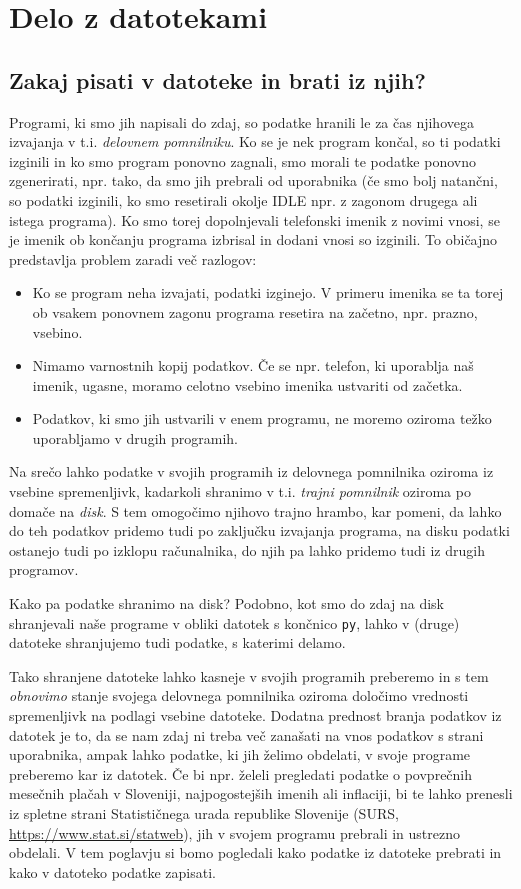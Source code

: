 \chapter{Delo z datotekami}

\section{Zakaj pisati v datoteke in brati iz njih?}

Programi, ki smo jih napisali do zdaj, so podatke hranili le za čas njihovega izvajanja v t.i. \emph{delovnem pomnilniku}. Ko se je nek program končal, so ti podatki izginili in ko smo program ponovno zagnali, smo morali te podatke ponovno zgenerirati, npr. tako, da smo jih prebrali od uporabnika (če smo bolj natančni, so podatki izginili, ko smo resetirali okolje IDLE npr. z zagonom drugega ali istega programa). Ko smo torej dopolnjevali telefonski imenik z novimi vnosi, se je imenik ob končanju programa izbrisal in dodani vnosi so izginili. To običajno predstavlja problem zaradi več razlogov:
\begin{itemize}
    \item Ko se program neha izvajati, podatki izginejo. V primeru imenika se ta torej ob vsakem ponovnem zagonu programa resetira na začetno, npr. prazno, vsebino.
    \item Nimamo varnostnih kopij podatkov. Če se npr. telefon, ki uporablja naš imenik, ugasne, moramo celotno vsebino imenika ustvariti od začetka.
    \item Podatkov, ki smo jih ustvarili v enem programu, ne moremo oziroma težko uporabljamo v drugih programih. 
\end{itemize}
Na srečo lahko podatke v svojih programih iz delovnega pomnilnika oziroma iz vsebine spremenljivk, kadarkoli shranimo v t.i. \emph{trajni pomnilnik} oziroma po domače na \emph{disk}. S tem omogočimo njihovo trajno hrambo, kar pomeni, da lahko do teh podatkov pridemo tudi po zaključku izvajanja programa, na disku podatki ostanejo tudi po izklopu računalnika, do njih pa lahko pridemo tudi iz drugih programov. 

Kako pa podatke shranimo na disk? Podobno, kot smo do zdaj na disk shranjevali naše programe v obliki datotek s končnico \texttt{py}, lahko v (druge) datoteke shranjujemo tudi podatke, s katerimi delamo. 

Tako shranjene datoteke lahko kasneje v svojih programih preberemo in s tem \emph{obnovimo} stanje svojega delovnega pomnilnika oziroma določimo vrednosti spremenljivk na podlagi vsebine datoteke. Dodatna prednost branja podatkov iz datotek je to, da se nam zdaj ni treba več zanašati na vnos podatkov s strani uporabnika, ampak lahko podatke, ki jih želimo obdelati, v svoje programe preberemo kar iz datotek. Če bi npr. želeli pregledati podatke o povprečnih mesečnih plačah v Sloveniji, najpogostejših imenih ali inflaciji, bi te lahko prenesli iz spletne strani Statističnega urada republike Slovenije (SURS, \url{https://www.stat.si/statweb}), jih v svojem programu prebrali in ustrezno obdelali. V tem poglavju si bomo pogledali kako podatke iz datoteke prebrati in kako v datoteko podatke zapisati.

